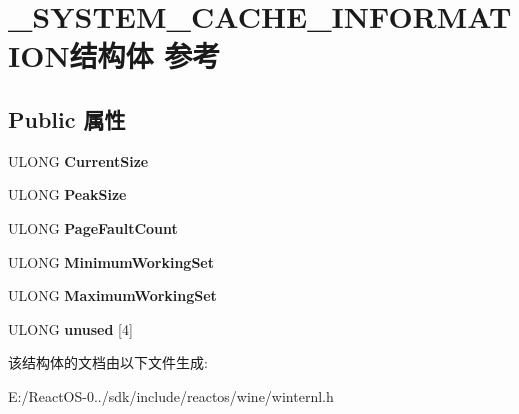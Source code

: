 \hypertarget{struct___s_y_s_t_e_m___c_a_c_h_e___i_n_f_o_r_m_a_t_i_o_n}{}\section{\+\_\+\+S\+Y\+S\+T\+E\+M\+\_\+\+C\+A\+C\+H\+E\+\_\+\+I\+N\+F\+O\+R\+M\+A\+T\+I\+O\+N结构体 参考}
\label{struct___s_y_s_t_e_m___c_a_c_h_e___i_n_f_o_r_m_a_t_i_o_n}
\subsection*{Public 属性}
\begin{DoxyCompactItemize}
\item 
\mbox{\label{struct___s_y_s_t_e_m___c_a_c_h_e___i_n_f_o_r_m_a_t_i_o_n_a1cec718fb33c2365a92a46cb5cd5042b}} 
U\+L\+O\+NG {\bfseries Current\+Size}
\item 
\mbox{\label{struct___s_y_s_t_e_m___c_a_c_h_e___i_n_f_o_r_m_a_t_i_o_n_a7c6365d78e2396a5e125aed777f023c5}} 
U\+L\+O\+NG {\bfseries Peak\+Size}
\item 
\mbox{\label{struct___s_y_s_t_e_m___c_a_c_h_e___i_n_f_o_r_m_a_t_i_o_n_af150671477658dd20f0ce70d289a9462}} 
U\+L\+O\+NG {\bfseries Page\+Fault\+Count}
\item 
\mbox{\label{struct___s_y_s_t_e_m___c_a_c_h_e___i_n_f_o_r_m_a_t_i_o_n_ac5fddc19fefbf0cda08dc327c35309d9}} 
U\+L\+O\+NG {\bfseries Minimum\+Working\+Set}
\item 
\mbox{\label{struct___s_y_s_t_e_m___c_a_c_h_e___i_n_f_o_r_m_a_t_i_o_n_a3a0fd96c2c7171b438156a86d81ef972}} 
U\+L\+O\+NG {\bfseries Maximum\+Working\+Set}
\item 
\mbox{\label{struct___s_y_s_t_e_m___c_a_c_h_e___i_n_f_o_r_m_a_t_i_o_n_a786e3b12351ab8b5842cd96a510cb4a0}} 
U\+L\+O\+NG {\bfseries unused} \mbox{[}4\mbox{]}
\end{DoxyCompactItemize}


该结构体的文档由以下文件生成\+:\begin{DoxyCompactItemize}
\item 
E\+:/\+React\+O\+S-\/0../sdk/include/reactos/wine/winternl.\+h\end{DoxyCompactItemize}
